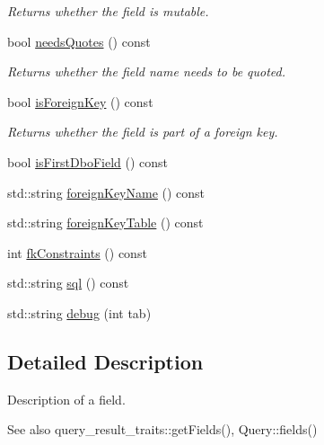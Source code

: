 \begin{DoxyCompactItemize}
\begin{DoxyCompactList}\small\item\em Returns whether the field is mutable. \end{DoxyCompactList}\item 
bool \hyperlink{classdbo_1_1mapping_1_1_field_info_abba9be734bfea0b4cf9c4408dcaa6d6e}{needs\+Quotes} () const 
\begin{DoxyCompactList}\small\item\em Returns whether the field name needs to be quoted. \end{DoxyCompactList}\item 
bool \hyperlink{classdbo_1_1mapping_1_1_field_info_ac56bc147c4c4385ae1b14e97055592a0}{is\+Foreign\+Key} () const 
\begin{DoxyCompactList}\small\item\em Returns whether the field is part of a foreign key. \end{DoxyCompactList}\item 
bool \hyperlink{classdbo_1_1mapping_1_1_field_info_ae694e49e7041d3a2795c87a7e2fa5064}{is\+First\+Dbo\+Field} () const 
\item 
std\+::string \hyperlink{classdbo_1_1mapping_1_1_field_info_adbc55f9c113054bed81ed7dd22aca09a}{foreign\+Key\+Name} () const 
\item 
std\+::string \hyperlink{classdbo_1_1mapping_1_1_field_info_ac90a4d26a0c091ba0a93960a8d8a8464}{foreign\+Key\+Table} () const 
\item 
int \hyperlink{classdbo_1_1mapping_1_1_field_info_ae7700af51bf1672d8d2db4a52b885c4d}{fk\+Constraints} () const 
\item 
std\+::string \hyperlink{classdbo_1_1mapping_1_1_field_info_a73d24bf3d349158bb842452a00c8655c}{sql} () const 
\item 
std\+::string \hyperlink{classdbo_1_1mapping_1_1_field_info_aafa055b3aa50d4a02cda73cb545d0a91}{debug} (int tab)
\end{DoxyCompactItemize}


\subsection{Detailed Description}
Description of a field. 

\begin{DoxySeeAlso}{See also}
query\+\_\+result\+\_\+traits\+::get\+Fields(), Query\+::fields() 
\end{DoxySeeAlso}



